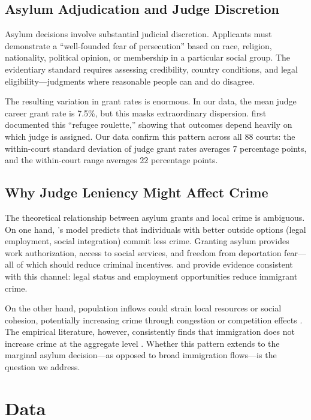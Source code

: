 \documentclass[12pt]{article}
\begin{document}
\subsection{Asylum Adjudication and Judge Discretion}

Asylum decisions involve substantial judicial discretion. Applicants must demonstrate a ``well-founded fear of persecution'' based on race, religion, nationality, political opinion, or membership in a particular social group. The evidentiary standard requires assessing credibility, country conditions, and legal eligibility---judgments where reasonable people can and do disagree.

The resulting variation in grant rates is enormous. In our data, the mean judge career grant rate is 7.5\%, but this masks extraordinary dispersion. \citet{ramji2021} first documented this ``refugee roulette,'' showing that outcomes depend heavily on which judge is assigned. Our data confirm this pattern across all 88 courts: the within-court standard deviation of judge grant rates averages 7 percentage points, and the within-court range averages 22 percentage points.

\subsection{Why Judge Leniency Might Affect Crime}

The theoretical relationship between asylum grants and local crime is ambiguous. On one hand, \citet{becker1968}'s model predicts that individuals with better outside options (legal employment, social integration) commit less crime. Granting asylum provides work authorization, access to social services, and freedom from deportation fear---all of which should reduce criminal incentives. \citet{freedman2018} and \citet{baker2015} provide evidence consistent with this channel: legal status and employment opportunities reduce immigrant crime.

On the other hand, population inflows could strain local resources or social cohesion, potentially increasing crime through congestion or competition effects \citep{card2001}. The empirical literature, however, consistently finds that immigration does not increase crime at the aggregate level \citep{ousey2018, sampson2008, butcher2007}. Whether this pattern extends to the marginal asylum decision---as opposed to broad immigration flows---is the question we address.


\section{Data}
\end{document}
